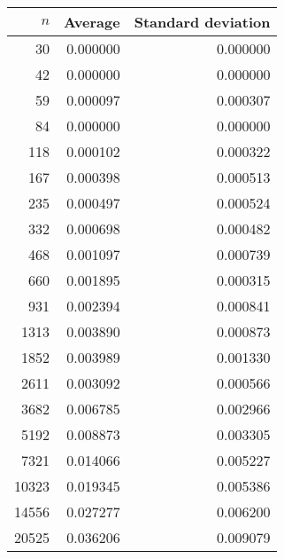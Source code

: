 \begin {tabular}{rrr}
$n$ & Average & Standard deviation\\ \hline 
30 & 0.000000 & 0.000000\\ 
42 & 0.000000 & 0.000000\\ 
59 & 0.000097 & 0.000307\\ 
84 & 0.000000 & 0.000000\\ 
118 & 0.000102 & 0.000322\\ 
167 & 0.000398 & 0.000513\\ 
235 & 0.000497 & 0.000524\\ 
332 & 0.000698 & 0.000482\\ 
468 & 0.001097 & 0.000739\\ 
660 & 0.001895 & 0.000315\\ 
931 & 0.002394 & 0.000841\\ 
1313 & 0.003890 & 0.000873\\ 
1852 & 0.003989 & 0.001330\\ 
2611 & 0.003092 & 0.000566\\ 
3682 & 0.006785 & 0.002966\\ 
5192 & 0.008873 & 0.003305\\ 
7321 & 0.014066 & 0.005227\\ 
10323 & 0.019345 & 0.005386\\ 
14556 & 0.027277 & 0.006200\\ 
20525 & 0.036206 & 0.009079\\ 
\end{tabular}
